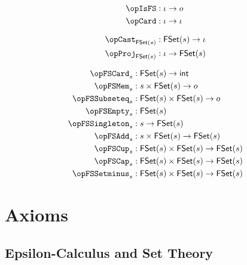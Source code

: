 \documentclass[11pt, a4paper, oneside]{article}
\begin{document}
\begin{minipage}[t]{.4\textwidth}
    \begin{align*}
        \opIsFS &: \idv \arr o \\
        \opCard &: \idv \arr \idv \\[7pt]
        \opCast_{\FSet(s)}  &: \FSet(s) \arr \idv \\
        \opProj_{\FSet(s)}  &: \idv \arr \FSet(s)
    \end{align*}
\end{minipage}%
\begin{minipage}[t]{.6\textwidth}
    \begin{align*}
        \opFSCard_s         &: \FSet(s) \arr \int \\
        \opFSMem_s          &: s \times \FSet(s) \arr o \\
        \opFSSubseteq_s     &: \FSet(s) \times \FSet(s) \arr o \\
        \opFSEmpty_s        &: \FSet(s) \\
        \opFSSingleton_s    &: s \arr \FSet(s) \\
        \opFSAdd_s          &: s \times \FSet(s) \arr \FSet(s) \\
        \opFSCup_s          &: \FSet(s) \times \FSet(s) \arr \FSet(s) \\
        \opFSCap_s          &: \FSet(s) \times \FSet(s) \arr \FSet(s) \\
        \opFSSetminus_s     &: \FSet(s) \times \FSet(s) \arr \FSet(s)
    \end{align*}
\end{minipage}


\newpage
\section{Axioms}
\label{sec:axioms}

    \subsection{Epsilon-Calculus and Set Theory}
    \label{subsec:epsilon_and_sets}
\end{document}
